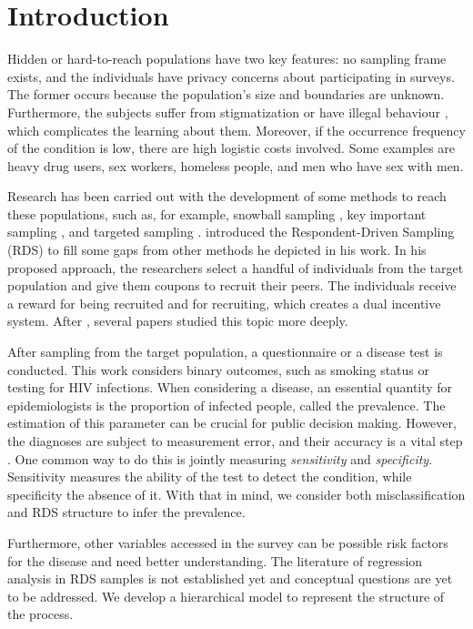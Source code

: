 \chapter{Introduction}

Hidden or hard-to-reach populations have two key features: no sampling frame
exists, and the individuals have privacy concerns about participating in
surveys. The former occurs because the population's size and boundaries are
unknown. Furthermore, the subjects suffer from stigmatization or have illegal
behaviour \cite{heckathorn1997}, which complicates the learning about them. Moreover, if the
occurrence frequency of the condition is low, there are high logistic costs
involved. Some examples are heavy drug users, sex workers, homeless people,
and men who have sex with men.

Research has been carried out with the development of some methods to reach these populations, such as, for example, snowball sampling \cite{goodman1961}, key
important sampling \cite{deaux-callaghan1985}, 
and targeted sampling \cite{watters-biernacki1989}. \textcite{heckathorn1997} introduced the Respondent-Driven Sampling (RDS) to fill some gaps from other methods he depicted in his work. In his proposed approach, the researchers select a handful of individuals from the target population and give them coupons to recruit their peers. The individuals receive a reward for being recruited and for recruiting, which creates a dual incentive system. After \textcite{heckathorn1997}, several papers studied this topic more deeply. 

After sampling from the target population, a questionnaire or a disease test
is conducted. This work considers binary outcomes, such as smoking status or
testing for HIV infections. When considering a disease, an essential quantity
for epidemiologists is the proportion of infected people, called the
prevalence. The estimation of this parameter can be crucial for public
decision making. However, the diagnoses are subject to measurement error, and their accuracy is
a vital step \cite{reitsma2005bivariate}. One common way to do this is jointly measuring {\em
sensitivity} and {\em specificity}. Sensitivity measures the ability of the
test to detect the condition, while specificity the absence of it. With that
in mind, we consider both misclassification and RDS structure to infer the
prevalence. 

Furthermore, other variables accessed in the survey can be possible risk
factors for the disease and need better understanding. The literature of
regression analysis in RDS samples is not established yet \cite[p.
15]{avery2021statistical} and conceptual questions are yet to be addressed. 
We develop a hierarchical model to represent the structure of the process. 


